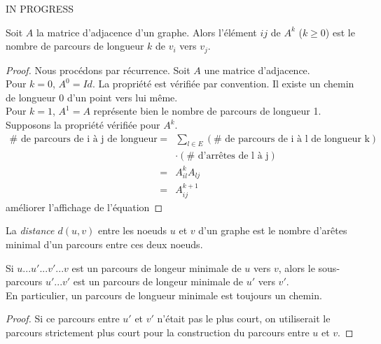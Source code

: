 \begin{myexem}
  IN PROGRESS
\end{myexem}

\begin{mytheo} 
  Soit $A$ la matrice d'adjacence d'un graphe. Alors l'élément $ij$ de $A^k$ ($k \geq 0$) est le nombre de parcours de longueur $k$ de $v_i$ vers $v_j$.
  \begin{proof}
    Nous procédons par récurrence. Soit $A$ une matrice d'adjacence.\\
     Pour $k=0$, $A^{0}=Id$. La propriété est vérifiée par convention. Il existe un chemin de longueur 0 d'un point vers lui même. \\
     Pour $k=1$, $A^{1}=A$ représente bien le nombre de parcours de longueur 1. \\
     Supposons la propriété vérifiée pour $A^{k}$. 
       $$ \left.\begin{array}{lll}
       \#\text{ de parcours de i à j de longueur k+1} & = &\displaystyle \sum_{l \in E} (\#\text{ de parcours de i à l de longueur k})  \\
       & & \cdot(\#\text{ d'arrêtes de l à j})\\
          & = & A_{il}^{k}A_{lj}\\
          & = & A_{ij}^{k+1}
          \end{array}\right. $$
  \addTODO améliorer l'affichage de l'équation
  \end{proof}
\end{mytheo}

\begin{mydef}
  La \emph{distance $d(u, v)$} entre les noeuds $u$ et $v$ d'un graphe est le nombre d'arêtes minimal d'un parcours entre ces deux noeuds.
\end{mydef}

\begin{mylem}
  Si $u...u'...v'...v$ est un parcours de longeur minimale de $u$ vers $v$, alors le sous-parcours $u'...v'$ est un parcours de longeur minimale de $u'$ vers $v'$.\\
  En particulier, un parcours de longueur minimale est toujours un chemin.
  \begin{proof}
    Si ce parcours entre $u'$ et $v'$ n'était pas le plus court, on utiliserait le parcours strictement plus court pour la construction du parcours entre $u$ et $v$.
  \end{proof}
\end{mylem}

